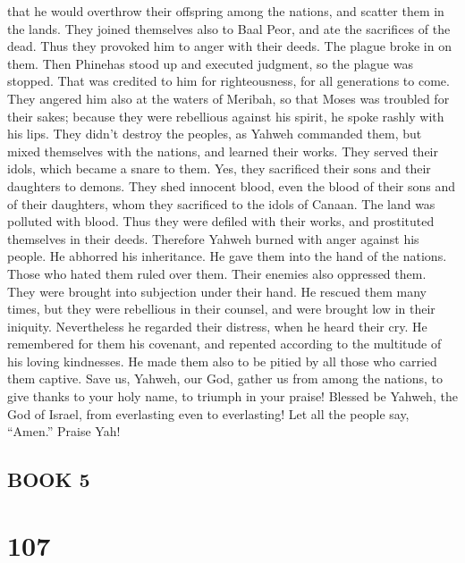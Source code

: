 that he would overthrow their offspring among the nations, and scatter
them in the lands.  They joined themselves also to Baal
Peor, and ate the sacrifices of the dead.  Thus they
provoked him to anger with their deeds. The plague broke in on them.
 Then Phinehas stood up and executed judgment, so the
plague was stopped.  That was credited to him for
righteousness, for all generations to come.  They angered
him also at the waters of Meribah, so that Moses was troubled for their
sakes;  because they were rebellious against his spirit,
he spoke rashly with his lips.  They didn't destroy the
peoples, as Yahweh commanded them,  but mixed themselves
with the nations, and learned their works.  They served
their idols, which became a snare to them.  Yes, they
sacrificed their sons and their daughters to demons. 
They shed innocent blood, even the blood of their sons and of their
daughters, whom they sacrificed to the idols of Canaan. The land was
polluted with blood.  Thus they were defiled with their
works, and prostituted themselves in their deeds. 
Therefore Yahweh burned with anger against his people. He abhorred his
inheritance.  He gave them into the hand of the nations.
Those who hated them ruled over them.  Their enemies also
oppressed them. They were brought into subjection under their hand.
 He rescued them many times, but they were rebellious in
their counsel, and were brought low in their iniquity. 
Nevertheless he regarded their distress, when he heard their cry.
 He remembered for them his covenant, and repented
according to the multitude of his loving kindnesses.  He
made them also to be pitied by all those who carried them captive.
 Save us, Yahweh, our God, gather us from among the
nations, to give thanks to your holy name, to triumph in your praise!
 Blessed be Yahweh, the God of Israel, from everlasting
even to everlasting! Let all the people say, ``Amen.'' Praise Yah!

\hypertarget{book-5}{%
\subsection{BOOK 5}\label{book-5}}

\hypertarget{section-99}{%
\section{107}\label{section-99}}

